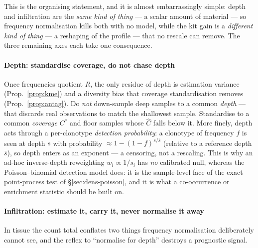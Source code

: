 \documentclass[11pt]{article}
\theoremstyle{oldplain}
\theoremstyle{oldrem}
\begin{document}
This is the organising statement, and it is almost embarrassingly simple: depth and infiltration are the
\emph{same kind of thing} --- a scalar amount of material --- so frequency normalisation kills both with no
model, while the kit gain is a \emph{different kind of thing} --- a reshaping of the profile --- that no rescale
can remove. The three remaining axes each take one consequence.

\paragraph{Depth: standardise coverage, do not chase depth} Once frequencies quotient $R$, the only residue of
depth is estimation variance (Prop.~\ref{prop:kme}) and a diversity bias that coverage standardisation removes
(Prop.~\ref{prop:antag}). Do \emph{not} down-sample deep samples to a common \emph{depth} --- that discards real
observations to match the shallowest sample. Standardise to a common \emph{coverage} $C^\ast$ and floor samples
whose $\hat C$ falls below it. More finely, depth acts through a per-clonotype \emph{detection probability}: a
clonotype of frequency $f$ is seen at depth $s$ with probability $\approx 1-(1-f)^{s/\bar s}$ (relative to a
reference depth $\bar s$), so depth enters as an exponent --- a censoring, not a rescaling. This is why an
ad-hoc inverse-depth reweighting $w_i\propto 1/s_i$ has \emph{no} calibrated null, whereas the
Poisson--binomial detection model does: it is the sample-level face of the exact point-process test of
\S\ref{sec:dens-poisson}, and it is what a co-occurrence or enrichment statistic should be built on.

\paragraph{Infiltration: estimate it, carry it, never normalise it away} In tissue the count total conflates two
things frequency normalisation deliberately cannot see, and the reflex to ``normalise for depth'' destroys a
prognostic signal.
\end{document}
